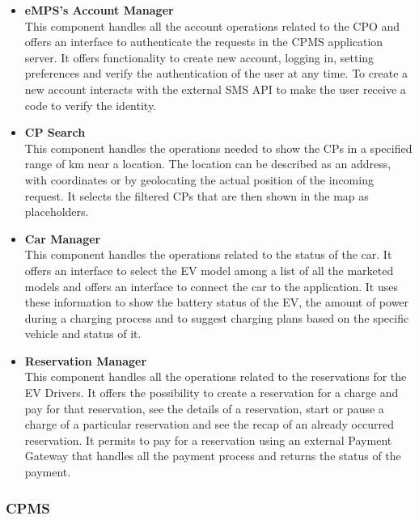 \begin{itemize}
    \item \textbf{eMPS's Account Manager} \\ This component handles all the account operations related to the CPO and offers an interface to authenticate
          the requests in the CPMS application server.
          It offers functionality to create new account, logging in, setting preferences and verify the authentication of the user at any time.
          To create a new account interacts with the external SMS API to make the user receive a code to verify the identity.
    \item \textbf{CP Search} \\ This component handles the operations needed to show the CPs in a specified range of km near a location. The location
          can be described as an address, with coordinates or by geolocating the actual position of the incoming request. It selects the filtered CPs that are then
          shown in the map as placeholders.
    \item \textbf{Car Manager} \\ This component handles the operations related to the status of the car. It offers an interface to select the EV model among a list of
          all the marketed models and offers an interface to connect the car to the application. It uses these information to show the battery status of the EV, the
          amount of power during a charging process and to suggest charging plans based on the specific vehicle and status of it.
    \item \textbf{Reservation Manager} \\ This component handles all the operations related to the reservations for the EV Drivers. It offers the possibility to create a reservation
          for a charge and pay for that reservation, see the details of a reservation, start or pause a charge of a particular reservation and see the recap of an already occurred reservation.
          It permits to pay for a reservation using an external Payment Gateway that handles all the payment process and returns the status of the payment.

\end{itemize}


\subsubsection{CPMS}

